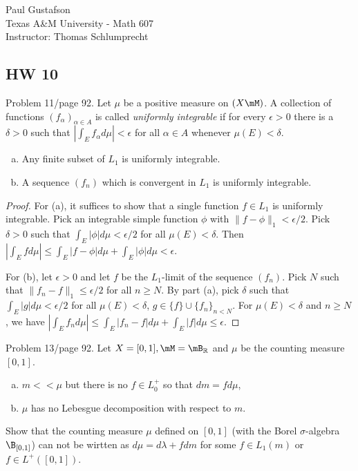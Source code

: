 \documentclass{article}
\begin{document}
\noindent Paul Gustafson\\
\noindent Texas A\&M University - Math 607\\ 
\noindent Instructor: Thomas Schlumprecht


\subsection*{HW 10}
  Problem 11/page 92. Let $\mu$ be a positive measure on $(X \mM)$. A collection of functions $(f_\alpha)_{\alpha \in A}$ is called \emph{uniformly integrable} if for every $\epsilon > 0$ there is a $\delta > 0$ such that $\left| \int_E f_\alpha d\mu \right| < \epsilon$ for all $\alpha \in A$ whenever $\mu(E) < \delta$.
\begin{enumerate}[a)]
\item Any finite subset of $L_1$ is uniformly integrable.
\item A sequence $(f_n)$ which is convergent in $L_1$ is uniformly integrable.
\end{enumerate}
\begin{proof}
For (a), it suffices to show that a single function $f \in L_1$ is uniformly integrable.  Pick an integrable simple function $\phi$ with
 $\|f - \phi\|_1 < \epsilon/2$.  Pick $\delta > 0$ such that $\int_E |\phi| d\mu < \epsilon/2$ for all $\mu(E) < \delta$.  
Then $\left| \int_E f d\mu \right| \le \int_E |f - \phi| d\mu + \int_E |\phi| d\mu < \epsilon$.

For (b), let $\epsilon > 0$ and let $f$ be the $L_1$-limit of the sequence $(f_n)$.  Pick $N$ such that $\| f_n - f \|_1 \le \epsilon/2$ for all $n \ge N$.  By part (a), pick $\delta$ such that $\int_E |g| d\mu  < \epsilon/2$ for all $\mu(E) < \delta$, $g \in \{f\} \cup \{f_n\}_{n < N}$.  
For $\mu(E) < \delta$ and $n \ge N$, we have 
$\left| \int_E f_n d\mu \right| \le \int_E |f_n -f| d\mu + \int_E |f| d\mu \le \epsilon$.
\end{proof}

 Problem 13/page 92.  Let $X = [0,1], \mM = \mB_\R$ and $\mu$ be the counting measure $[0,1]$.
\begin{enumerate}[a)]
\item $m << \mu$ but there is no $f \in L_0^+$ so that $dm = f d\mu$,
\item $\mu$ has no Lebesgue decomposition with respect to $m$.
\end{enumerate}
Show that the counting measure $\mu$ defined on $[0,1]$ (with the Borel $\sigma$-algebra $\B_{[0,1]}$) can not be wirtten as $d \mu = d \lambda + f dm$ for some $f \in L_1(m)$ or $f \in L^+([0,1])$.
\end{document}
